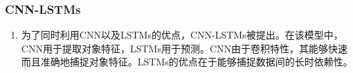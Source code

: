 
\subsubsection{ CNN-LSTMs}\label{cnn-lstms}

\begin{enumerate}
\def\labelenumi{\arabic{enumi}.}
\item
  为了同时利用CNN以及LSTMs的优点，CNN-LSTMs被提出。在该模型中，CNN用于提取对象特征，LSTMs用于预测。CNN由于卷积特性，其能够快速而且准确地捕捉对象特征。LSTMs的优点在于能够捕捉数据间的长时依赖性。
\end{enumerate}











